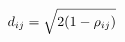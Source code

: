 \documentclass[preview]{standalone}
\begin{document}
\begin{align*}
\special{dvisvgm:raw <g id='unique000'>}d_{ij} = \sqrt{2(1-\rho_{ij})}\special{dvisvgm:raw </g>}
\end{align*}
\end{document}
